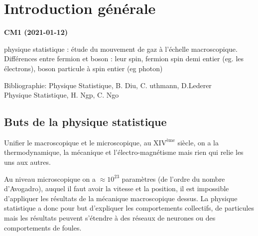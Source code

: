 \documentclass[12pt,a4paper]{report}
\author{Malo Kerebel}
\begin{document}
\begin{titlepage}

\end{titlepage}

\tableofcontents

\chapter{Introduction générale}
\begin{center}
\textbf{CM1 (2021-01-12)}
\end{center}

physique statistique : étude du mouvement de gaz à l'échelle macroscopique.
Différences entre fermion et boson : leur spin, fermion spin demi entier (eg. les électrons), boson particule à spin entier (eg photon)\par
\quad \par
Bibliographie:
Physique Statistique, B. Diu, C. uthmann, D.Lederer\\
Physique Statistique, H. Ngp, C. Ngo\par
\quad \par

\section{Buts de la physique statistique}
Unifier le macroscopique et le microscopique, au $\text{XIV}^{\text{\`eme}}$ siècle, on a la thermodynamique, la mécanique et l'électro-magnétisme mais rien qui relie les uns aux autres.

Au niveau microscopique on a $\approx 10^{23}$ paramètres (de l'ordre du nombre d'Avogadro), auquel il faut avoir la vitesse et la position, il est impossible d'appliquer les résultats de la mécanique macroscopique dessus.
La physique statistique a donc pour but d'expliquer les comportements collectifs, de particules mais les résultats peuvent s'étendre à des réseaux de neurones ou des comportements de foules.
\end{document}
